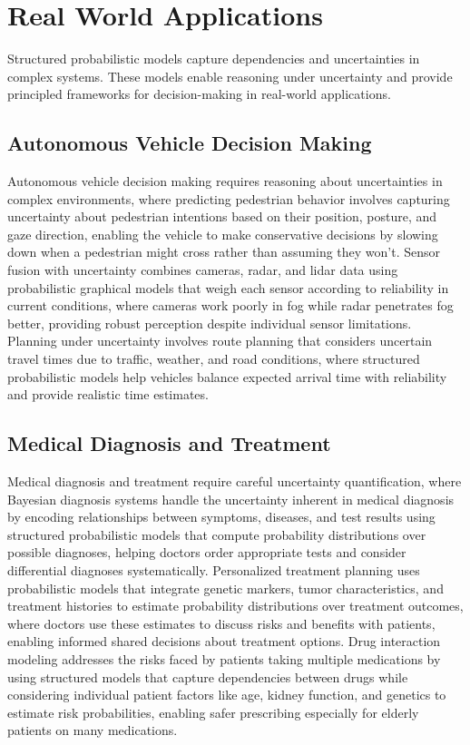 
\section{Real World Applications}
\label{sec:structured-prob-real-world}


Structured probabilistic models capture dependencies and uncertainties in complex systems. These models enable reasoning under uncertainty and provide principled frameworks for decision-making in real-world applications.

\subsection{Autonomous Vehicle Decision Making}

Autonomous vehicle decision making requires reasoning about uncertainties in complex environments, where predicting pedestrian behavior involves capturing uncertainty about pedestrian intentions based on their position, posture, and gaze direction, enabling the vehicle to make conservative decisions by slowing down when a pedestrian might cross rather than assuming they won't. Sensor fusion with uncertainty combines cameras, radar, and lidar data using probabilistic graphical models that weigh each sensor according to reliability in current conditions, where cameras work poorly in fog while radar penetrates fog better, providing robust perception despite individual sensor limitations. Planning under uncertainty involves route planning that considers uncertain travel times due to traffic, weather, and road conditions, where structured probabilistic models help vehicles balance expected arrival time with reliability and provide realistic time estimates.

\subsection{Medical Diagnosis and Treatment}

Medical diagnosis and treatment require careful uncertainty quantification, where Bayesian diagnosis systems handle the uncertainty inherent in medical diagnosis by encoding relationships between symptoms, diseases, and test results using structured probabilistic models that compute probability distributions over possible diagnoses, helping doctors order appropriate tests and consider differential diagnoses systematically. Personalized treatment planning uses probabilistic models that integrate genetic markers, tumor characteristics, and treatment histories to estimate probability distributions over treatment outcomes, where doctors use these estimates to discuss risks and benefits with patients, enabling informed shared decisions about treatment options. Drug interaction modeling addresses the risks faced by patients taking multiple medications by using structured models that capture dependencies between drugs while considering individual patient factors like age, kidney function, and genetics to estimate risk probabilities, enabling safer prescribing especially for elderly patients on many medications.

